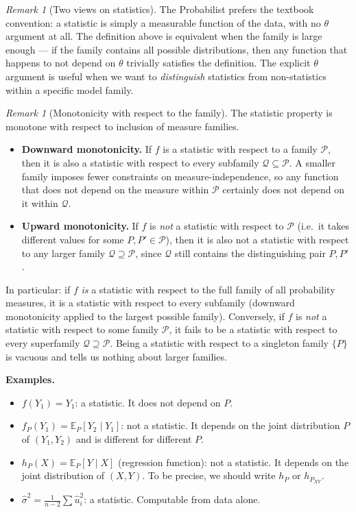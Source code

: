 \documentclass[a4paper,oneside,12pt]{extarticle}
\theoremstyle{plain}
\theoremstyle{definition}
\theoremstyle{remark}
\newtheorem{remark}[proposition]{Remark}
\newcommand*{\E}{\mathbb{E}}
\begin{document}
\begin{remark}[Two views on statistics]
The Probabilist prefers the textbook convention: a statistic is simply a
measurable function of the data, with no $\theta$ argument at all.
The definition above is equivalent when the family is large enough ---
if the family contains all possible distributions, then any function
that happens to not depend on $\theta$ trivially satisfies the
definition. The explicit $\theta$ argument is useful when we want to
\emph{distinguish} statistics from non-statistics within a specific
model family.
\end{remark}

\begin{remark}[Monotonicity with respect to the family]
The statistic property is monotone with respect to inclusion of
measure families.
\begin{itemize}
  \item \textbf{Downward monotonicity.} If $f$ is a statistic with
        respect to a family $\mathcal{P}$, then it is also a statistic
        with respect to every subfamily $\mathcal{Q} \subseteq
        \mathcal{P}$. A smaller family imposes fewer constraints on
        measure-independence, so any function that does not depend on
        the measure within $\mathcal{P}$ certainly does not depend on
        it within $\mathcal{Q}$.
  \item \textbf{Upward monotonicity.} If $f$ is \emph{not} a statistic
        with respect to $\mathcal{P}$ (i.e.\ it takes different values
        for some $P, P' \in \mathcal{P}$), then it is also not a
        statistic with respect to any larger family $\mathcal{Q}
        \supseteq \mathcal{P}$, since $\mathcal{Q}$ still contains
        the distinguishing pair $P, P'$.
\end{itemize}
In particular: if $f$ \emph{is} a statistic with respect to the full
family of all probability measures, it is a statistic with respect to
every subfamily (downward monotonicity applied to the largest possible
family). Conversely, if $f$ is \emph{not} a statistic with respect to
some family $\mathcal{P}$, it fails to be a statistic with respect to
every superfamily $\mathcal{Q}\supseteq\mathcal{P}$. Being a statistic
with respect to a singleton family $\{P\}$ is vacuous and tells us
nothing about larger families.
\end{remark}

\textbf{Examples.}
\begin{itemize}
  \item $f(Y_1) = Y_1$: a statistic. It does not depend on $P$.
  \item $f_P(Y_1) = \E_P[Y_2 \mid Y_1]$: not a statistic. It depends
        on the joint distribution $P$ of $(Y_1,Y_2)$ and is different
        for different $P$.
  \item $h_P(X) = \E_P[Y \mid X]$ (regression function): not a
        statistic. It depends on the joint distribution of $(X,Y)$.
        To be precise, we should write $h_P$ or $h_{P_{XY}}$.
  \item $\hat\sigma^2 = \frac{1}{n-2}\sum\hat u_i^2$: a statistic.
        Computable from data alone.
\end{itemize}
\end{document}
